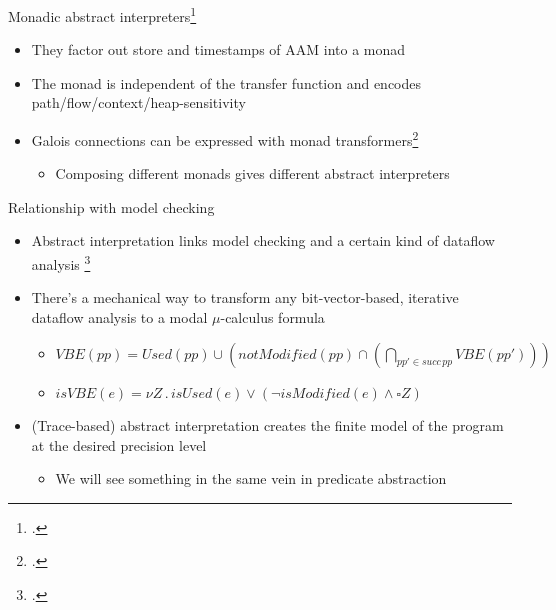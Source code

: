 \documentclass[aspectratio=169,notes]{beamer}
\begin{document}

\begin{frame}{Monadic abstract interpreters\footcite{sergey2013monadic}}
  \begin{itemize}
  \item They factor out store and timestamps of AAM into a monad
  \item The monad is independent of the transfer function and encodes path/flow/context/heap-sensitivity
  \item Galois connections can be expressed with monad transformers\footcite{darais2015galois}
    \begin{itemize}
    \item  Composing different monads gives different abstract interpreters
    \end{itemize}
  \end{itemize}
\end{frame}

\begin{frame}{Relationship with model checking}
  \small
  \begin{itemize}[<+->]
  \item Abstract interpretation links model
    checking and a certain kind of dataflow analysis
    \footcite{schmidt1998program,schmidt1998data}
  \item There's a mechanical way to transform any bit-vector-based,
    iterative dataflow analysis to a modal $\mu$-calculus formula
    \begin{itemize}
    \item
      $VBE(pp) = Used(pp) \cup (notModified(pp) \cap (\bigcap_{pp' \in
        succ\, pp} VBE(pp')))$
      \vspace{.5em}
    \item
      $isVBE(e) = \nu Z \,.\, isUsed(e) \vee (\neg isModified(e)
      \wedge \square Z)$
    \end{itemize}
  \item (Trace-based) abstract interpretation creates the finite model of the
    program at the desired precision level
    \begin{itemize}
    \item We will see something in the same vein in predicate abstraction
    \end{itemize}
  \end{itemize}
\end{frame}
\end{document}
